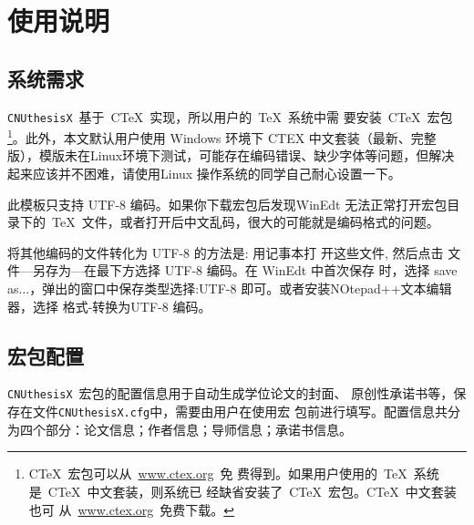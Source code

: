 
\chapter{使用说明}

\section{系统需求}

\texttt{CNUthesisX}~基于~C\TeX~实现，所以用户的~\TeX~系统中需
要安装~C\TeX~宏包\footnote{C\TeX~宏包可以从~\url{www.ctex.org}~免
费得到。如果用户使用的~\TeX~系统是~C\TeX~中文套装，则系统已
经缺省安装了~C\TeX~宏包。C\TeX~中文套装也可
从~\url{www.ctex.org}~免费下载。}。此外，本文默认用户使用 Windows 环境下 CTEX 中文套装（最新、完整版），模版未在Linux环境下测试，可能存在编码错误、缺少字体等问题，但解决起来应该并不困难，请使用Linux 操作系统的同学自己耐心设置一下。

此模板只支持 UTF-8 编码。如果你下载宏包后发现WinEdt 无法正常打开宏包目录下的~\TeX~文件，或者打开后中文乱码，很大的可能就是编码格式的问题。

将其他编码的文件转化为 UTF-8 的方法是: 用记事本打
开这些文件, 然后点击 文件—另存为—在最下方选择 UTF-8 编码。在 WinEdt 中首次保存
时，选择 save as...，弹出的窗口中保存类型选择:UTF-8 即可。或者安装NOtepad++文本编辑器，选择 格式-转换为UTF-8 编码。



\section{宏包配置}
\label{section:cfg}

\texttt{CNUthesisX}~宏包的配置信息用于自动生成学位论文的封面、
原创性承诺书等，保存在文件\texttt{CNUthesisX.cfg}中，需要由用户在使用宏
包前进行填写。配置信息共分为四个部分：论文信息；作者信息；导师信息；承诺书信息。
